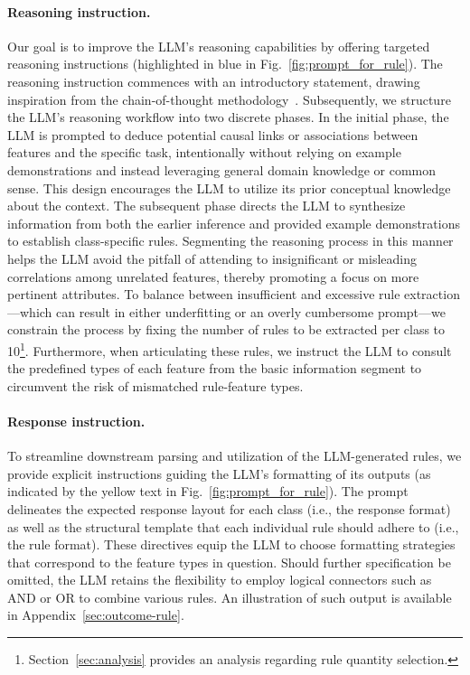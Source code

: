 \paragraph{Reasoning instruction.} Our goal is to improve the LLM's reasoning capabilities by offering targeted reasoning instructions (highlighted in blue in Fig.~\ref{fig:prompt_for_rule}). The reasoning instruction commences with an introductory statement, drawing inspiration from the chain-of-thought methodology~\cite{wei2022chain}. Subsequently, we structure the LLM’s reasoning workflow into two discrete phases. In the initial phase, the LLM is prompted to deduce potential causal links or associations between features and the specific task, intentionally without relying on example demonstrations and instead leveraging general domain knowledge or common sense. This design encourages the LLM to utilize its prior conceptual knowledge about the context. The subsequent phase directs the LLM to synthesize information from both the earlier inference and provided example demonstrations to establish class-specific rules. Segmenting the reasoning process in this manner helps the LLM avoid the pitfall of attending to insignificant or misleading correlations among unrelated features, thereby promoting a focus on more pertinent attributes. To balance between insufficient and excessive rule extraction—which can result in either underfitting or an overly cumbersome prompt—we constrain the process by fixing the number of rules to be extracted per class to 10\footnote{Section~\ref{sec:analysis} provides an analysis regarding rule quantity selection.}. Furthermore, when articulating these rules, we instruct the LLM to consult the predefined types of each feature from the basic information segment to circumvent the risk of mismatched rule-feature types.

\vspace*{-0.12in}
\paragraph{Response instruction.} To streamline downstream parsing and utilization of the LLM-generated rules, we provide explicit instructions guiding the LLM’s formatting of its outputs (as indicated by the yellow text in Fig.~\ref{fig:prompt_for_rule}). The prompt delineates the expected response layout for each class (i.e., the response format) as well as the structural template that each individual rule should adhere to (i.e., the rule format). These directives equip the LLM to choose formatting strategies that correspond to the feature types in question. Should further specification be omitted, the LLM retains the flexibility to employ logical connectors such as AND or OR to combine various rules. An illustration of such output is available in Appendix~\ref{sec:outcome-rule}.

